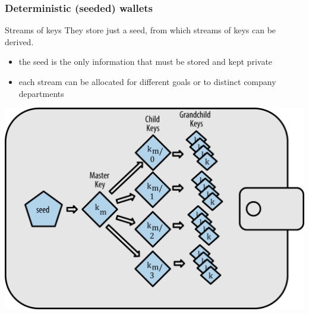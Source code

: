 \documentclass[11pt]{beamer}  %
\begin{document}
\begin{frame}\frametitle{Deterministic (seeded) wallets}

  \begin{greenbox}{Streams of keys}
    They store just a seed, from which streams of keys can be derived.
    \begin{itemize}
    \item the seed is the only information that must be stored and kept private
    \item each stream can be allocated for different goals or to
      distinct company departments
    \end{itemize}
  \end{greenbox}

  \medskip

  \begin{center}
    \includegraphics[scale=0.85,clip=false]{pictures/hd-wallet.png}
  \end{center}

\end{frame}
\end{document}
